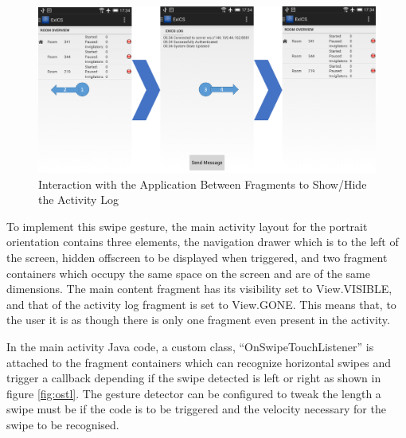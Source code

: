 \begin{figure}[!htpb]
	\centering
	\includegraphics[width=\textwidth]{"screenshots/flowchart"}
	\caption{Interaction with the Application Between Fragments to Show/Hide the Activity Log}
	\label{fig:swipe_flowchart}
\end{figure}

\FloatBarrier

\FloatBarrier

To implement this swipe gesture, the main activity layout for the portrait orientation contains three elements, the navigation drawer which is to the left of the screen, hidden offscreen to be displayed when triggered, and two fragment containers which occupy the same space on the screen and are of the same dimensions.  The main content fragment has its visibility set to View.VISIBLE, and that of the activity log fragment is set to View.GONE.  This means that, to the user it is as though there is only one fragment even present in the activity.

In the main activity Java code, a custom class, ``OnSwipeTouchListener'' is attached to the fragment containers which can recognize horizontal swipes and trigger a callback depending if the swipe detected is left or right as shown in figure \ref{fig:ostl}.  The gesture detector can be configured to tweak the length a swipe must be if the code is to be triggered and the velocity necessary for the swipe to be recognised.

